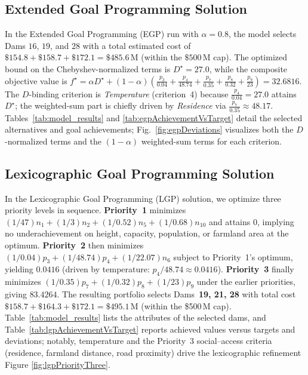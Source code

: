 


\subsection{Extended Goal Programming Solution}
In the Extended Goal Programming (EGP) run with $\alpha=0.8$, the model selects Dams $16$, $19$, and $28$ with a total estimated cost of $\$154.8+\$158.7+\$172.1=\$485.6$\,M (within the $\$500$\,M cap). The optimized bound on the Chebyshev-normalized terms is $D^\star=27.0$, while the composite objective value is $f^\star=\alpha D^\star + (1-\alpha)\!\left(\frac{p_3}{0.04}+\frac{p_4}{48.74}+\frac{p_7}{0.35}+\frac{p_8}{0.32}+\frac{p_9}{23}\right)=32.6816$. The $D$-binding criterion is \emph{Temperature} (criterion~4) because $\tfrac{p_4}{0.04}=27.0$ attains $D^\star$; the weighted-sum part is chiefly driven by \emph{Residence} via $\tfrac{p_7}{0.35}\approx 48.17$. Tables~\ref{tab:model_results} and \ref{tab:egpAchievementVsTarget} detail the selected alternatives and goal achievements; Fig.~\ref{fig:egpDeviations} visualizes both the $D$-normalized terms and the $(1-\alpha)$ weighted-sum terms for each criterion. 





\subsection{Lexicographic Goal Programming Solution}
In the Lexicographic Goal Programming (LGP) solution, we optimize three priority levels in sequence. \textbf{Priority~1} minimizes $(1/47)n_1+(1/3)n_2+(1/0.52)n_5+(1/0.68)n_{10}$ and attains $0$, implying no underachievement on height, capacity, population, or farmland area at the optimum. \textbf{Priority~2} then minimizes $(1/0.04)p_3+(1/48.74)p_4+(1/22.07)n_6$ subject to Priority~1’s optimum, yielding $0.0416$ (driven by temperature: $p_4/48.74\approx 0.0416$). \textbf{Priority~3} finally minimizes $(1/0.35)p_7+(1/0.32)p_8+(1/23)p_9$ under the earlier priorities, giving $83.4264$. The resulting portfolio selects Dams~\textbf{19, 21, 28} with total cost $\$158.7+\$164.3+\$172.1=\$495.1$\,M (within the \$500\,M cap). Table~\ref{tab:model_results} lists the attributes of the selected dams, and Table~\ref{tab:lgpAchievementVsTarget} reports achieved values versus targets and deviations; notably, temperature and the Priority~3 social–access criteria (residence, farmland distance, road proximity) drive the lexicographic refinement Figure \ref{fig:lgpPriorityThree}.

